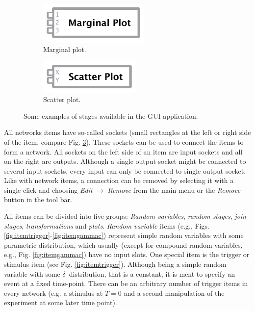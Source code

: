 \begin{figure}[!ht]
  \begin{subfigure}[c]{0.4\textwidth}
    \centering
 	\includegraphics[width=0.6\textwidth]{fig/guiplot.pdf}
 	\caption{Marginal plot.} \label{fig:itemplot}
 \end{subfigure}\hfill
  \begin{subfigure}[c]{0.4\textwidth}
    \centering
 	\includegraphics[width=0.55\textwidth]{fig/guiscatter.pdf}
 	\caption{Scatter plot.} \label{fig:itemscatter}
 \end{subfigure}
 \caption{Some examples of stages available in the GUI application.} \label{fig:items}
\end{figure}

All networks items have so-called sockets (small rectangles at the left or right side of the item, compare Fig. \ref{fig:items}). These sockets can be used to connect the items to form a network. All sockets on the left side of an item are input sockets and all on the right are outputs. Although a single output socket might be connected to several input sockets, every input can only be connected to single output socket. Like with network items, a connection can be removed by selecting it with a single click and choosing \emph{Edit} $\rightarrow$ \emph{Remove} from the main menu or the \emph{Remove} button in the tool bar.

All items can be divided into five groups: \emph{Random variables}, \emph{random stages}, \emph{join stages}, \emph{transformations} and \emph{plots}. \emph{Random variable} items (e.g., Figs. \ref{fig:itemtrigger}-\ref{fig:itemgammac}) represent simple random variables with some parametric distribution, which usually (except for compound random variables, e.g., Fig. \ref{fig:itemgammac}) have no input slots. One special item is the trigger or stimulus item (see Fig. \ref{fig:itemtrigger}). Although being a simple random variable with some $\delta$~distribution, that is a constant, it is ment to specify an event at a fixed time-point. There can be an arbitrary number of trigger items in every network (e.g. a stimulus at $T=0$ and a second manipulation of the experiment at some later time point).

